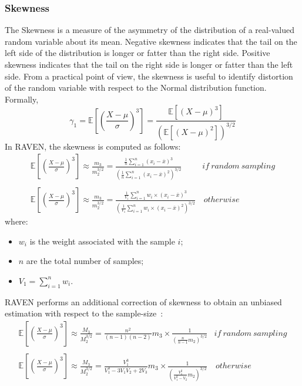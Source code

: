 \subsubsection{Skewness}
The Skewness is a measure of the asymmetry of the distribution of a 
real-valued random variable about its mean. Negative skewness 
indicates that the tail on the left side of the distribution is longer or fatter 
than the right side.  Positive skewness indicates that the tail on the right 
side is longer or fatter than the left side. From a practical point of view, the 
skewness is useful to identify distortion  of the random variable with respect to
the Normal distribution function.
\\Formally, 
\begin{equation}
\gamma_{1} = \mathbb{E} \left [ \left ( \frac{X-\mu}{\sigma} \right )^{3} \right ] = \frac{ \mathbb{E}\left [ \left ( X-\mu \right )^{3} \right ]}{\left ( \mathbb{E}\left [ \left ( X-\mu \right )^{2} \right ] \right )^{3/2}}
\end{equation}
In RAVEN, the skewness is computed as follows:
\begin{equation}
\begin{matrix}
\mathbb{E} \left [ \left ( \frac{X-\mu}{\sigma} \right )^{3} \right ]  \approx \frac{m_{3}}{m_{2}^{3/2}} = \frac{  \frac{1}{n} \sum_{i=1}^{n}  (x_{i} - \overline{x})^{3} }{\left ( \frac{1}{n} \sum_{i=1}^{n}  (x_{i} - \overline{x})^{2} \right )^{3/2}} & if \: random \: sampling  
\\
\\
\mathbb{E} \left [ \left ( \frac{X-\mu}{\sigma} \right )^{3} \right ]  \approx \frac{m_{3}}{m_{2}^{3/2}} = \frac{  \frac{1}{V_{1}} \sum_{i=1}^{n} w_{i} \times (x_{i} - \overline{x})^{3} }{\left ( \frac{1}{V_{1}} \sum_{i=1}^{n}  w_{i} \times (x_{i} - \overline{x})^{2} \right )^{3/2}} &  \, otherwise
\end{matrix}
\end{equation}
where:
\begin{itemize}
  \item $w_{i}$ is the weight associated with the sample $i$;
  \item $n$ are the total number of samples;
  \item $V_{1} = \sum_{i=1}^{n} w_{i}$.
\end{itemize}
RAVEN performs an additional correction of skewness to obtain an unbiased estimation  with respect to the sample-size~\cite{RimoldiniUnbiased}:
\begin{equation}
\begin{matrix}
\mathbb{E} \left [ \left ( \frac{X-\mu}{\sigma} \right )^{3} \right ]  \approx \frac{M_{3}}{M_{2}^{3/2}}  = \displaystyle \frac{n^{2}}{(n-1)(n-2)}m_{3}\times \frac{1}{\left ( \displaystyle \frac{n}{n-1}m_{2}  \right )^{3/2}} & if \: random \: sampling  
\\
\\
\mathbb{E} \left [ \left ( \frac{X-\mu}{\sigma} \right )^{3} \right ]  \approx \frac{M_{3}}{M_{2}^{3/2}}  = \displaystyle \frac{V_{1}^{3}}{V_{1}^{3}-3V_{1}V_{2}+2V_{3}}m_{3} \times \frac{1}{\left ( \displaystyle \frac{V_{1}^{2}}{V_{1}^{2}-V_{2}}m_{2}  \right )^{3/2}} &  \, otherwise
\end{matrix}
\end{equation}
